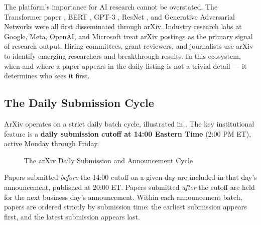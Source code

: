 \documentclass[12pt]{article}
\begin{document}
The platform's importance for AI research cannot be overstated. The Transformer paper \citep{vaswani2017}, BERT \citep{devlin2019}, GPT-3 \citep{brown2020}, ResNet \citep{he2016}, and Generative Adversarial Networks \citep{goodfellow2014} were all first disseminated through arXiv. Industry research labs at Google, Meta, OpenAI, and Microsoft treat arXiv postings as the primary signal of research output. Hiring committees, grant reviewers, and journalists use arXiv to identify emerging researchers and breakthrough results. In this ecosystem, when and where a paper appears in the daily listing is not a trivial detail --- it determines who sees it first.

\subsection{The Daily Submission Cycle}

ArXiv operates on a strict daily batch cycle, illustrated in . The key institutional feature is a \textbf{daily submission cutoff at 14:00 Eastern Time} (2:00 PM ET), active Monday through Friday.

\begin{figure}[H]
\centering
{}
\caption{The arXiv Daily Submission and Announcement Cycle}
\label{fig:timeline}
\end{figure}

Papers submitted \textit{before} the 14:00 cutoff on a given day are included in that day's announcement, published at 20:00 ET. Papers submitted \textit{after} the cutoff are held for the next business day's announcement. Within each announcement batch, papers are ordered strictly by submission time: the earliest submission appears first, and the latest submission appears last.
\end{document}
